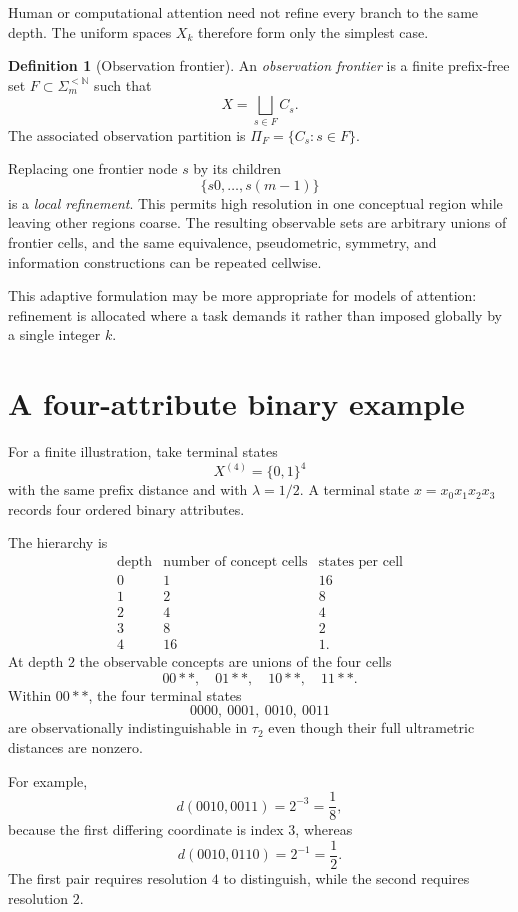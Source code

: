 \documentclass[11pt]{article}
\theoremstyle{definition}
\newtheorem{definition}[theorem]{Definition}
\theoremstyle{remark}
\newcommand{\N}{\mathbb N}
\newcommand{\cyl}[1]{C_{#1}}
\begin{document}
Human or computational attention need not refine every branch to the same depth.  The uniform spaces $X_k$ therefore form only the simplest case.

\begin{definition}[Observation frontier]
An \emph{observation frontier} is a finite prefix-free set $F\subset\Sigma_m^{<\N}$ such that
\[
X=\bigsqcup_{s\in F}\cyl{s}.
\]
The associated observation partition is $\Pi_F=\{\cyl{s}:s\in F\}$.
\end{definition}

Replacing one frontier node $s$ by its children
\[
\{s0,\ldots,s(m-1)\}
\]
is a \emph{local refinement}.  This permits high resolution in one conceptual region while leaving other regions coarse.  The resulting observable sets are arbitrary unions of frontier cells, and the same equivalence, pseudometric, symmetry, and information constructions can be repeated cellwise.

This adaptive formulation may be more appropriate for models of attention: refinement is allocated where a task demands it rather than imposed globally by a single integer $k$.

\section{A four-attribute binary example}

For a finite illustration, take terminal states
\[
X^{(4)}=\{0,1\}^4
\]
with the same prefix distance and with $\lambda=1/2$.  A terminal state $x=x_0x_1x_2x_3$ records four ordered binary attributes.

The hierarchy is
\[
\begin{array}{c|c|c}
\text{depth}&\text{number of concept cells}&\text{states per cell}\\
\hline
0&1&16\\
1&2&8\\
2&4&4\\
3&8&2\\
4&16&1.
\end{array}
\]
At depth $2$ the observable concepts are unions of the four cells
\[
00** ,\quad 01** ,\quad 10** ,\quad 11**.
\]
Within $00**$, the four terminal states
\[
0000,\ 0001,\ 0010,\ 0011
\]
are observationally indistinguishable in $\tau_2$ even though their full ultrametric distances are nonzero.

For example,
\[
d(0010,0011)=2^{-3}=\frac18,
\]
because the first differing coordinate is index $3$, whereas
\[
d(0010,0110)=2^{-1}=\frac12.
\]
The first pair requires resolution $4$ to distinguish, while the second requires resolution $2$.
\end{document}
